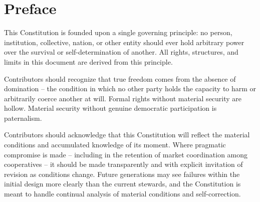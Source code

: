 %

\vspace{2cm}

\section*{Preface}

This Constitution is founded upon a single governing principle: no person, institution, collective, nation, or other entity should ever hold arbitrary power over the survival or self-determination of another. All rights, structures, and limits in this document are derived from this principle.

Contributors should recognize that true freedom comes from the absence of domination -- the condition in which no other party holds the capacity to harm or arbitrarily coerce another at will. Formal rights without material security are hollow. Material security without genuine democratic participation is paternalism.

Contributors should acknowledge that this Constitution will reflect the material conditions and accumulated knowledge of its moment. Where pragmatic compromise is made -- including in the retention of market coordination among cooperatives -- it should be made transparently and with explicit invitation of revision as conditions change. Future generations may see failures within the initial design more clearly than the current stewards, and the Constitution is meant to handle continual analysis of material conditions and self-correction.

\clearpage